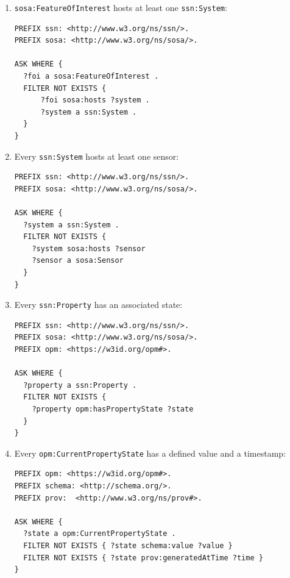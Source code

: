 \begin{enumerate}
\item 
\texttt{sosa:FeatureOfInterest} hosts at least one \texttt{ssn:System}:

\begin{lstlisting}[language=N3, caption={This query returns true if there exists at least one \texttt{sosa:FeatureOfInterest} that does not host any \texttt{ssn:System}.}, label=lst:validation1]
PREFIX ssn: <http://www.w3.org/ns/ssn/>.
PREFIX sosa: <http://www.w3.org/ns/sosa/>.

ASK WHERE {
  ?foi a sosa:FeatureOfInterest .
  FILTER NOT EXISTS { 
      ?foi sosa:hosts ?system . 
      ?system a ssn:System . 
  }
}
\end{lstlisting}

\item 
Every \texttt{ssn:System} hosts at least one sensor:
\begin{lstlisting}[language=N3, caption={This query returns \texttt{true} if there exists at least one \texttt{ssn:System} that does not host any \texttt{sosa:sensor}}, label=lst:validation2]
PREFIX ssn: <http://www.w3.org/ns/ssn/>.
PREFIX sosa: <http://www.w3.org/ns/sosa/>.

ASK WHERE {
  ?system a ssn:System .
  FILTER NOT EXISTS {
    ?system sosa:hosts ?sensor
    ?sensor a sosa:Sensor
  }
}
\end{lstlisting}

\item 
Every \texttt{ssn:Property} has an associated state:
\begin{lstlisting}[language=N3, caption={This query returns \texttt{true} if there exists at least one \texttt{ssn:Property} that has no property state}, label=lst:validation3]
PREFIX ssn: <http://www.w3.org/ns/ssn/>.
PREFIX sosa: <http://www.w3.org/ns/sosa/>.
PREFIX opm: <https://w3id.org/opm#>.

ASK WHERE {
  ?property a ssn:Property .
  FILTER NOT EXISTS {
    ?property opm:hasPropertyState ?state
  }
}

\end{lstlisting}

\item 
Every \texttt{opm:CurrentPropertyState} has a defined value and a timestamp:
\begin{lstlisting}[language=N3, caption={This query returns \texttt{true} if there exists at least one \texttt{opm:CurrentPropertyState} that does not have either a \texttt{schema:value} or \texttt{prov:generatedAtTime} property.}, label=lst:validation4]
PREFIX opm: <https://w3id.org/opm#>.
PREFIX schema: <http://schema.org/>.
PREFIX prov:  <http://www.w3.org/ns/prov#>.

ASK WHERE {
  ?state a opm:CurrentPropertyState .
  FILTER NOT EXISTS { ?state schema:value ?value }
  FILTER NOT EXISTS { ?state prov:generatedAtTime ?time }
}
\end{lstlisting}

\end{enumerate}

